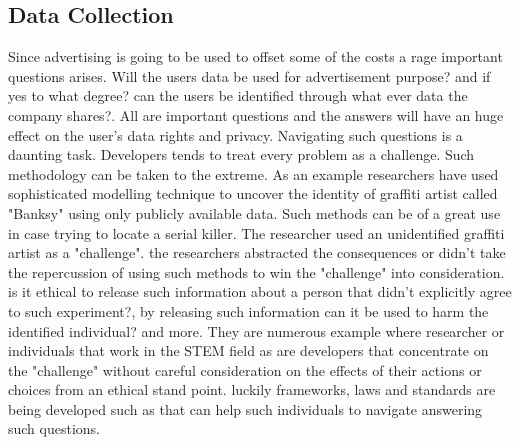 \documentclass{article}
\begin{document}
\subsection{Data Collection}
Since advertising is going to be used to offset some of the costs a rage important questions arises. Will the users data be used for advertisement purpose? and if yes to what degree? can the users  be identified through what ever data the company shares?. All are important questions and the answers will have an huge effect on the user's data rights and privacy. Navigating such questions is a daunting task. Developers tends to treat every problem as a challenge. Such methodology can be taken to the extreme. As an example researchers have used sophisticated modelling technique to uncover the identity of graffiti artist called "Banksy" using only publicly available data\cite{Hauge2016}. Such methods can be of a great use in case trying to locate a serial killer. The researcher used an unidentified graffiti artist as a "challenge". the researchers abstracted the consequences or didn't take the repercussion of using such methods to win the "challenge" into consideration. is it ethical to release such information about a person that didn't explicitly agree to such experiment?, by releasing such information can it be used to harm the identified individual? and more. They are numerous example where researcher or individuals that work in the STEM field as are developers that concentrate on the "challenge" without careful consideration on the effects of their actions or choices from an ethical stand point. luckily frameworks, laws and standards are being developed such as \cite{Zook2017} that can help such individuals to navigate answering such questions.     

 

\end{document}
